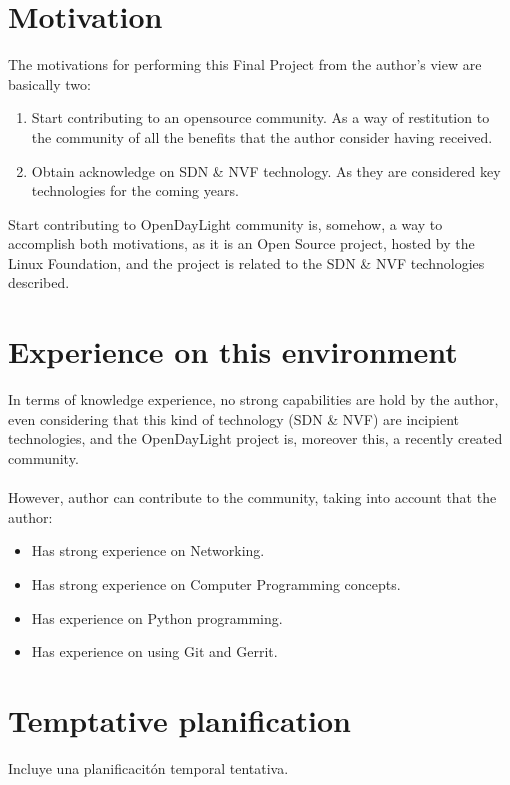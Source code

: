 \documentclass[10pt]{article}
\begin{document}
\section{Motivation}

The motivations for performing this Final Project from the author's view are basically two:\\
\begin{enumerate}
\item{Start  contributing to an opensource community}. As a way of restitution to the community of all the benefits that the author consider having received.
\item{Obtain acknowledge on SDN \& NVF technology}. As they are considered key technologies for the coming years.
\end{enumerate} 
Start contributing to OpenDayLight community is, somehow, a way to accomplish both motivations, as it is an Open Source project, hosted by the Linux Foundation, and the project is related to the SDN \& NVF technologies described.

\section{Experience on this environment}

In terms of knowledge experience, no strong capabilities are hold by the author, even considering that this kind of technology (SDN \& NVF) are incipient technologies, and the OpenDayLight project is, moreover this, a recently created community.\\
\\
However, author can contribute to the community, taking into account that the author:
\begin{itemize}
\item{Has strong experience on Networking.}
\item{Has strong experience on Computer Programming concepts.}
\item{Has experience on Python programming.}
\item{Has experience on using Git and Gerrit.}
\end{itemize}

\section{Temptative planification}

Incluye una planificacitón temporal tentativa. 
\end{document}
